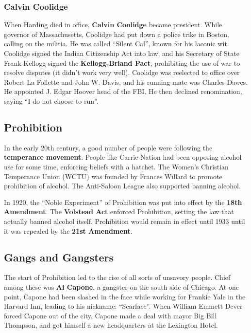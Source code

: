 \subsubsection*{Calvin Coolidge}

When Harding died in office, \textbf{Calvin Coolidge} became president.
While governor of Massachusetts, Coolidge had put down a police trike in Boston, calling on the militia.
He was called ``Silent Cal'', known for his laconic wit.
Coolidge signed the Indian Citizenship Act into law,
and his Secretary of State Frank Kellogg signed the \textbf{Kellogg-Briand Pact},
prohibiting the use of war to resolve disputes (it didn't work very well).
Coolidge was reelected to office over Robert La Follette and John W. Davis, and his running mate was Charles Dawes.
He appointed J. Edgar Hoover head of the FBI\@.
He then declined renomination, saying ``I do not choose to run''.

\subsection*{Prohibition}

In the early 20th century, a good number of people were following the \textbf{temperance movement}.
People like Carrie Nation had been opposing alcohol use for some time, enforcing beliefs with a hatchet.
The Women's Christian Temperance Union (WCTU) was founded by Frances Willard to promote prohibition of alcohol.
The Anti-Saloon League also supported banning alcohol.

In 1920, the ``Noble Experiment'' of Prohibition was put into effect by the \textbf{18th Amendment}.
The \textbf{Volstead Act} enforced Prohibition, setting the law that actually banned alcohol itself.
Prohibition would remain in effect until 1933 until it was repealed by the \textbf{21st Amendment}.

\subsection*{Gangs and Gangsters}

The start of Prohibition led to the rise of all sorts of unsavory people.
Chief among these was \textbf{Al Capone}, a gangster on the south side of Chicago.
At one point, Capone had been slashed in the face while working for Frankie Yale in the Harvard Inn,
leading to his nickname: ``Scarface''.
When William Emmett Dever forced Capone out of the city, Capone made a deal with mayor Big Bill Thompson,
and got himself a new headquarters at the Lexington Hotel.

